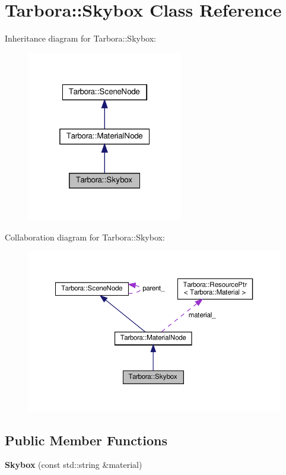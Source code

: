 \hypertarget{classTarbora_1_1Skybox}{}\section{Tarbora\+:\+:Skybox Class Reference}
\label{classTarbora_1_1Skybox}


Inheritance diagram for Tarbora\+:\+:Skybox\+:
\nopagebreak
\begin{figure}[H]
\begin{center}
\leavevmode
\includegraphics[width=193pt]{classTarbora_1_1Skybox__inherit__graph}
\end{center}
\end{figure}


Collaboration diagram for Tarbora\+:\+:Skybox\+:
\nopagebreak
\begin{figure}[H]
\begin{center}
\leavevmode
\includegraphics[width=350pt]{classTarbora_1_1Skybox__coll__graph}
\end{center}
\end{figure}
\subsection*{Public Member Functions}
\begin{DoxyCompactItemize}
\item 
\mbox{\label{classTarbora_1_1Skybox_abe7e80c249015320a22323ea920310de}} 
{\bfseries Skybox} (const std\+::string \&material)
\end{DoxyCompactItemize}
